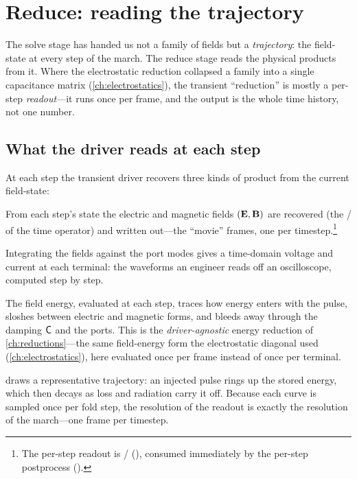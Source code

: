\section{Reduce: reading the trajectory}
\label{sec:tr-reduce}

The solve stage has handed us not a family of fields but a \emph{trajectory}: the
field-state at every step of the march. The reduce stage reads the physical products
from it. Where the electrostatic reduction collapsed a family into a single
capacitance matrix (\cref{ch:electrostatics}), the transient ``reduction'' is
mostly a per-step \emph{readout}---it runs once per frame, and the output is the
whole time history, not one number.

\subsection{What the driver reads at each step}

At each step the transient driver recovers three kinds of product from the current
field-state:

\begin{description}[style=nextline, leftmargin=0pt, font=\normalfont\itshape]
  \item[The fields.] From each step's state the electric and magnetic fields
  $(\mathbf{E},\mathbf{B})$ are recovered (the / of the time operator) and
  written out---the ``movie'' frames, one per timestep.\footnote{The per-step readout
  is  / 
  (), consumed immediately by the
  per-step postprocess 
  ().}
  \item[Port voltages and currents.] Integrating the fields against the port modes
  gives a time-domain voltage and current at each terminal: the waveforms an
  engineer reads off an oscilloscope, computed step by step.
  \item[Energy versus time.] The field energy, evaluated at each step, traces how
  energy enters with the pulse, sloshes between electric and magnetic forms, and
  bleeds away through the damping $\mathsf{C}$ and the ports. This is the
  \emph{driver-agnostic} energy reduction of \cref{ch:reductions}---the same
  field-energy form the electrostatic diagonal used (\cref{ch:electrostatics}),
  here evaluated once per frame instead of once per terminal.
\end{description}

 draws a representative trajectory: an injected pulse rings up
the stored energy, which then decays as loss and radiation carry it off. Because
each curve is sampled once per fold step, the resolution of the readout is exactly
the resolution of the march---one frame per timestep.

